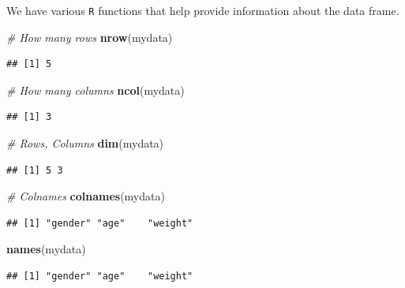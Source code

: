 \documentclass[
]{book}
\newenvironment{Shaded}{\begin{snugshade}}{\end{snugshade}}
\newcommand{\CommentTok}[1]{\textcolor[rgb]{0.56,0.35,0.01}{\textit{#1}}}
\newcommand{\KeywordTok}[1]{\textcolor[rgb]{0.13,0.29,0.53}{\textbf{#1}}}
\newcommand{\NormalTok}[1]{#1}
\begin{document}
We have various \texttt{R} functions that help provide information about the data frame.

\begin{Shaded}
\begin{Highlighting}[]
\CommentTok{# How many rows}
\KeywordTok{nrow}\NormalTok{(mydata)}
\end{Highlighting}
\end{Shaded}

\begin{verbatim}
## [1] 5
\end{verbatim}

\begin{Shaded}
\begin{Highlighting}[]
\CommentTok{# How many columns}
\KeywordTok{ncol}\NormalTok{(mydata)}
\end{Highlighting}
\end{Shaded}

\begin{verbatim}
## [1] 3
\end{verbatim}

\begin{Shaded}
\begin{Highlighting}[]
\CommentTok{# Rows, Columns}
\KeywordTok{dim}\NormalTok{(mydata)}
\end{Highlighting}
\end{Shaded}

\begin{verbatim}
## [1] 5 3
\end{verbatim}

\begin{Shaded}
\begin{Highlighting}[]
\CommentTok{# Colnames}
\KeywordTok{colnames}\NormalTok{(mydata)}
\end{Highlighting}
\end{Shaded}

\begin{verbatim}
## [1] "gender" "age"    "weight"
\end{verbatim}

\begin{Shaded}
\begin{Highlighting}[]
\KeywordTok{names}\NormalTok{(mydata)}
\end{Highlighting}
\end{Shaded}

\begin{verbatim}
## [1] "gender" "age"    "weight"
\end{verbatim}
\end{document}
